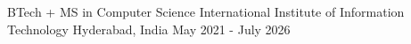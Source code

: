 
\begin{cventries}
  \cventry
    {BTech + MS in Computer Science} %
    {International Institute of Information Technology} %
    {Hyderabad, India} %
    {May 2021 - July 2026} %
    {}
\end{cventries}
